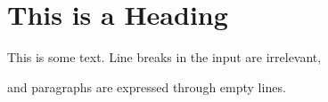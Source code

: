 \documentclass{scrartcl}
\begin{document}
\section{This is a Heading}

This is some text.
Line breaks in the input are irrelevant,

and paragraphs are expressed through empty lines.
\end{document}
